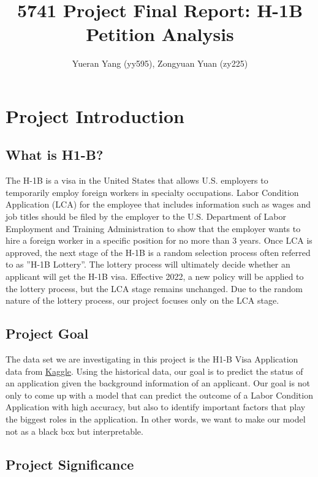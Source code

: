\documentclass{article}
\title{\vspace{-1.5cm}5741 Project Final Report: H-1B Petition Analysis}
\author{Yueran Yang (yy595), Zongyuan Yuan (zy225)}
\date{}
\begin{document}
\maketitle
\vspace{-3em}

\section{Project Introduction}

\subsection{What is H1-B?}

The H-1B is a visa in the United States that allows U.S. employers to temporarily employ foreign workers in specialty occupations. Labor Condition Application (LCA) for the employee that includes information such as wages and job titles should be filed by the employer to the U.S. Department of Labor Employment and Training Administration to show that the employer wants to hire a foreign worker in a specific position for no more than 3 years. Once LCA is approved, the next stage of the H-1B is a random selection process often referred to as ”H-1B Lottery”. The lottery process will ultimately decide whether an applicant will get the H-1B visa. Effective 2022, a new policy will be applied to the lottery process, but the LCA stage remains unchanged. Due to the random nature of the lottery process, our project focuses only on the LCA stage.

\subsection{Project Goal}
The data set we are investigating in this project is the H1-B Visa Application data from \href{https://www.kaggle.com/abishekanbarasan1995/h1b-case-status-prediction}{Kaggle}. Using the historical data, our goal is to predict the status of an application given the background information of an applicant. Our goal is not only to come up with a model that can predict the outcome of a Labor Condition Application with high accuracy, but also to identify important factors that play the biggest roles in the application. In other words, we want to make our model not as a black box but interpretable.

\subsection{Project Significance}
\end{document}
